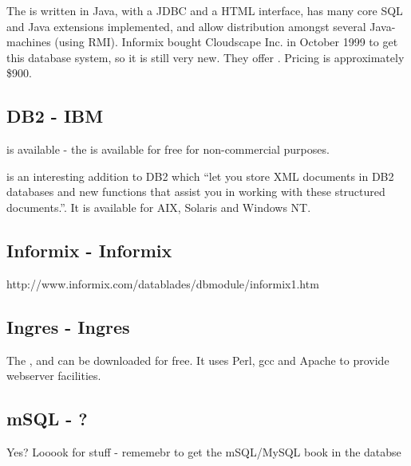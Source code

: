 The
 is written in Java, with a JDBC and a HTML interface, has
many core SQL and Java extensions implemented, and allow distribution
amongst several Java-machines (using RMI).  Informix bought Cloudscape
Inc. in October 1999 to get this database system, so it is still very
new.  They offer
.  Pricing is approximately \$900.


\subsection{DB2 - IBM}
\label{sec:db2}

is available - the  is available
for free for non-commercial purposes.  

 is an interesting addition to DB2 which ``let you
store XML documents in DB2 databases and new functions that assist you
in working with these structured documents.''.  It is available for
AIX, Solaris and Windows NT. 

  

\subsection{Informix - Informix}
\label{sec:informix}

http://www.informix.com/datablades/dbmodule/informix1.htm

 
\subsection{Ingres - Ingres}
\label{sec:ingres}

The
, and can be downloaded for
free.  It uses Perl, gcc and Apache to provide webserver facilities.


\subsection{mSQL - ?}
\label{sec:msql}

\textsf{Yes?  Looook for stuff - rememebr to get the mSQL/MySQL book
  in the databse}

